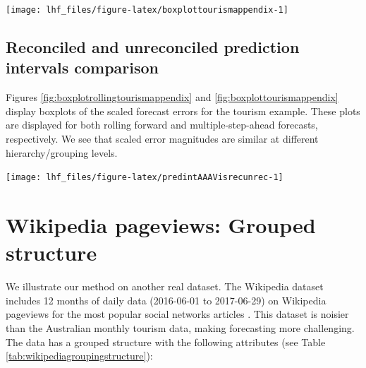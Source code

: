 \documentclass[11pt,a4paper,]{article}
\let\origfigure\figure
\let\endorigfigure\endfigure
\renewenvironment{figure}[1][2] {
    \expandafter\origfigure\expandafter[!htbp]
} {
    \endorigfigure
}
\begin{document}
\begin{figure}

{\centering \texttt{[image: lhf\_files/figure-latex/boxplottourismappendix-1]} 

}

\caption{Box plots of scaled forecast errors from reconciled and unreconciled ETS, ARIMA, and OLS fixed origin forecasts for tourism demand data. Panels are different hierarchy levels.}\label{fig:boxplottourismappendix}
\end{figure}

\hypertarget{reconciled-and-unreconciled-prediction-intervals-comparison}{%
\subsection{Reconciled and unreconciled prediction intervals comparison}\label{reconciled-and-unreconciled-prediction-intervals-comparison}}

Figures \ref{fig:boxplotrollingtourismappendix} and \ref{fig:boxplottourismappendix} display boxplots of the scaled forecast errors for the tourism example. These plots are displayed for both rolling forward and multiple-step-ahead forecasts, respectively. We see that scaled error magnitudes are similar at different hierarchy/grouping levels.

\begin{figure}

{\centering \texttt{[image: lhf\_files/figure-latex/predintAAAVisrecunrec-1]} 

}

\caption{Comparing forecasts and prediction intervals of 'AAAVis' bottom-level series across methods. Left: rolling origin. Right: fixed origin.}\label{fig:predintAAAVisrecunrec}
\end{figure}

\hypertarget{wikipedia-pageviews-grouped-structure}{%
\section{Wikipedia pageviews: Grouped structure}\label{wikipedia-pageviews-grouped-structure}}

We illustrate our method on another real dataset. The Wikipedia dataset includes 12 months of daily data (2016-06-01 to 2017-06-29) on Wikipedia pageviews for the most popular social networks articles \autocite{ashouri2018}. This dataset is noisier than the Australian monthly tourism data, making forecasting more challenging. The data has a grouped structure with the following attributes (see Table \ref{tab:wikipediagroupingstructure}):
\end{document}
